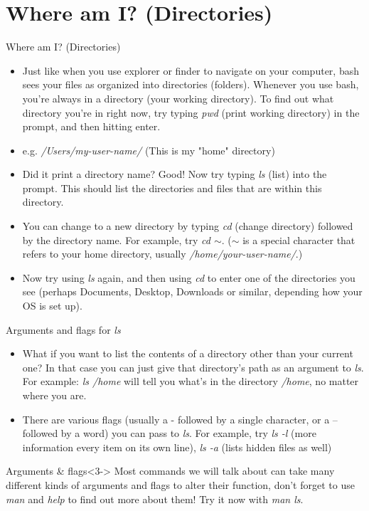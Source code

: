 \documentclass{beamer}
\begin{document}
\section{Where am I? (Directories)}
\begin{frame}{Where am I? (Directories)}
\begin{itemize}
    \item<1-> Just like when you use explorer or finder to navigate on your computer, bash sees your files as organized into directories (folders). Whenever you use bash, you're always in a directory (your working directory). To find out what directory you're in right now, try typing \emph{pwd} (print working directory) in the prompt, and then hitting enter.
    \item<2-> e.g. \textit{/Users/my-user-name/} (This is my "home" directory)
    \item<3-> Did it print a directory name? Good! Now try typing \emph{ls} (list) into the prompt. This should list the directories and files that are within this directory. 
    \item<4-> You can change to a new directory by typing \emph{cd} (change directory) followed by the directory name. For example, try \emph{cd $\sim$}. (\emph{$\sim$} is a special character that refers to your home directory, usually \textit{/home/your-user-name/}.) 
    \item<5-> Now try using \emph{ls} again, and then using \emph{cd} to enter one of the directories you see (perhaps Documents, Desktop, Downloads or similar, depending how your OS is set up).
\end{itemize}
\end{frame}

\begin{frame}{Arguments and flags for \emph{ls}}
\begin{itemize}
    \item<1-> What if you want to list the contents of a directory other than your current one? In that case you can just give that directory's path as an \alert{argument} to \emph{ls}. For example: \emph{ls /home} will tell you what's in the directory \textit{/home}, no matter where you are.
    \item<2-> There are various \alert{flags} (usually a - followed by a single character, or a -- followed by a word) you can pass to \emph{ls}. For example, try \emph{ls -l} (more information every item on its own line), \emph{ls -a} (lists hidden files as well)
\end{itemize}
\begin{block}{Arguments \& flags}<3-> 
Most commands we will talk about can take many different kinds of arguments and flags to alter their function, don't forget to use \emph{man} and \emph{help} to find out more about them! Try it now with \emph{man ls}. 
\end{block}
\end{frame}
\end{document}
